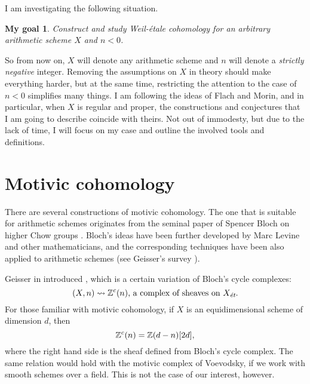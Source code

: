 \documentclass{article}
\theoremstyle{plain}
\newtheorem*{mygoal*}{My goal}
\begin{document}
I am investigating the following situation.

\begin{mygoal*}
  Construct and study Weil-étale cohomology for an arbitrary arithmetic scheme
  $X$ and $n < 0$.
\end{mygoal*}

So from now on, $X$ will denote any arithmetic scheme and $n$ will denote a
\emph{strictly negative} integer. Removing the assumptions on $X$ in theory
should make everything harder, but at the same time, restricting the attention
to the case of $n < 0$ simplifies many things. I am following the ideas of Flach
and Morin, and in particular, when $X$ is regular and proper, the constructions
and conjectures that I am going to describe coincide with theirs. Not out of
immodesty, but due to the lack of time, I will focus on my case and outline the
involved tools and definitions.


\section{Motivic cohomology}

There are several constructions of motivic cohomology. The one that is suitable
for arithmetic schemes originates from the seminal paper of Spencer Bloch on
higher Chow groups \cite{Bloch-1986}. Bloch's ideas have been further developed
by Marc Levine and other mathematicians, and the corresponding techniques have
been also applied to arithmetic schemes (see Geisser's survey
\cite{Geisser-survey}).

Geisser in \cite{Geisser-10} introduced , which
is a certain variation of Bloch's cycle complexes:
$$(X,n) \rightsquigarrow \mathbb{Z}^c (n) \text{, a complex of sheaves on }X_\text{\it ét}.$$
For those familiar with motivic cohomology, if $X$ is an equidimensional scheme
of dimension $d$, then
$$\mathbb{Z}^c (n) = \mathbb{Z} (d-n) [2d],$$
where the right hand side is the sheaf defined from Bloch's cycle complex.
The same relation would hold with the motivic complex of Voevodsky, if we work
with smooth schemes over a field. This is not the case of our interest, however.
\end{document}
